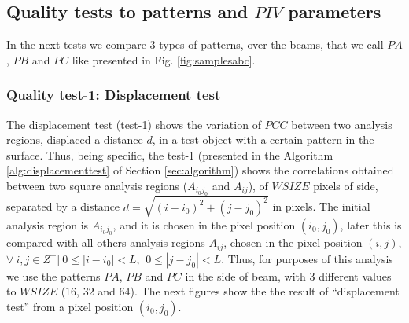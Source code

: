 
\subsection{Quality tests to patterns and $PIV$ parameters}
\label{sec:qualitytests}
In the next tests we compare 3 types of patterns, over the beams, 
that we call $PA$, $PB$ and $PC$ like presented in 
Fig. \ref{fig:samplesabc}.

\subsubsection{Quality test-1: Displacement test}
The displacement test (test-1) shows the variation of $PCC$ between two analysis regions,
displaced a distance $d$, in a test object with a certain pattern in the surface. 
Thus, being specific,
the test-1 (presented in the Algorithm \ref{alg:displacementtest} of Section \ref{sec:algorithm})
shows the correlations obtained between two square analysis 
regions ($A_{i_0 j_0}$ and $A_{ij}$),
of $WSIZE$ pixels of side, separated by a distance $d=\sqrt{(i-i_0)^2+(j-j_0)^2}$ in pixels.
The initial analysis region is $A_{i_0 j_0}$, and it is chosen in the pixel position $(i_0,j_0)$, 
later this is compared with all others analysis 
regions $A_{ij}$, chosen in the pixel position $(i,j)$, $\forall~i,j \in Z^+|~ 0 \leq |i-i_0| < L$, $~ 0 \leq |j-j_0| < L$.
Thus, for purposes of this analysis we use the patterns $PA$, $PB$ and $PC$ in the side of beam, with
3 different values to $WSIZE$ ($16$, $32$ and $64$).
The next figures show the the result of ``displacement test'' from a pixel position $(i_0,j_0)$.


